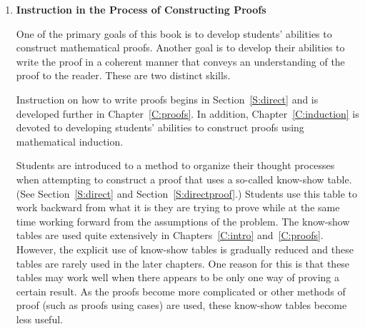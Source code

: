 \begin{enumerate}

\item \textbf{Instruction in the Process of Constructing Proofs}

One of the primary goals of this book is to develop students' abilities to construct mathematical proofs.  Another goal is to develop their abilities to write the proof in a coherent manner that conveys an understanding of the proof to the reader.  These are two distinct skills.

Instruction on how to write proofs begins in Section~\ref{S:direct} and is developed further in Chapter~\ref{C:proofs}.  In addition, Chapter~\ref{C:induction} is devoted to developing students' abilities to construct proofs using mathematical induction.  

Students are introduced to a method to organize their thought processes when attempting to construct a proof that uses a so-called know-show table. (See Section~\ref{S:direct} and Section~\ref{S:directproof}.)  Students use this table to work backward from what it is they are trying to prove while at the same time working forward from the assumptions of the problem.  The know-show tables are used quite extensively in Chapters~\ref{C:intro} and~\ref{C:proofs}.  However, the explicit use of know-show tables is gradually reduced and these tables are rarely used in the later chapters.  One reason for this is that these tables may work well when there appears to be only one way of proving a certain result.  As the proofs become more complicated or other methods of proof (such as proofs using cases) are used, these know-show tables become less useful.



\end{enumerate}

